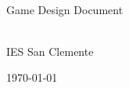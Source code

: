 \begin{titlepage}
    \centering
    \vspace*{\fill} %


    {\Huge \textbf{\thetitle}} \\[1cm]
    {\large Game Design Document} \\[1.5cm]

    \vspace*{\fill}

    {\large \textbf{\theauthor}} \\ [1cm]
    {\large IES San Clemente} \\[4cm]

    \vspace*{\fill} %

    {\large \today}

    \restoregeometry %
\end{titlepage}

